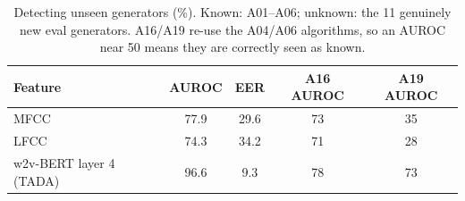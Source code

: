 \begin{table}[t]
\centering\small
\caption{Detecting unseen generators (\%). Known: A01--A06; unknown: the 11 genuinely new eval generators. A16/A19 re-use the A04/A06 algorithms, so an AUROC near 50 means they are correctly seen as known.}
\label{tab:ood}
\begin{tabular}{lcccc}
\toprule
Feature & AUROC & EER & A16 AUROC & A19 AUROC \\
\midrule
MFCC & 77.9 & 29.6 & 73 & 35 \\
LFCC & 74.3 & 34.2 & 71 & 28 \\
w2v-BERT layer 4 (TADA) & 96.6 & 9.3 & 78 & 73 \\
\bottomrule
\end{tabular}
\end{table}